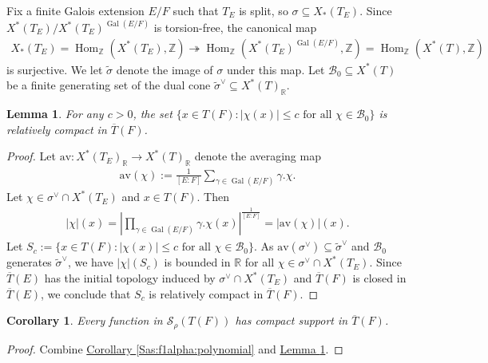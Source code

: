 \documentclass[10pt]{amsart}
\newtheorem{corollary}{Corollary}[theorem]
\newtheorem{lemma}[theorem]{Lemma}
\theoremstyle{definition}
\numberwithin{equation}{section}
\DeclareMathOperator{\Hom}{\mathrm{Hom}}
\DeclareMathOperator{\Gal}{\mathrm{Gal}}
\numberwithin{equation}{subsection}
\newcommand{\ZZ}{\mathbb{Z}}
\newcommand{\RR}{\mathbb{R}}
\begin{document}
Fix a finite Galois extension $E/F$ such that $T_E$ is split, so $\sigma\subseteq X_\ast(T_E).$  Since $X^*(T_{E})/X^*(T_{E})^{\Gal(E/F)}$ is torsion-free, the canonical map 
\begin{align*}
    X_*(T_{E}) = \Hom_\ZZ(X^*(T_{E}),\ZZ) \twoheadrightarrow \Hom_\ZZ(X^*(T_{E})^{\Gal(E/F)},\ZZ) = \Hom_\ZZ(X^*(T),\ZZ)
\end{align*}
is surjective. We let $\widetilde{\sigma}$ denote the image of $\sigma$ under this map. Let $\mathcal{B}_0\subseteq X^*(T)$ be a finite generating set of the dual cone $\widetilde{\sigma}^\vee\subseteq X^*(T)_\RR$. 

\begin{lemma}\label{toric:relcpt:1}
For any $c>0$, the set $\{x\in T(F): |\chi(x)|\leq c\text{ for all }\chi\in \mathcal{B}_0\}$ is relatively compact in $\overline{T}(F)$.
\end{lemma}
\begin{proof} Let $\mathrm{av}:X^*(T_E)_\RR\to X^*(T)_\RR$ denote the averaging map
\begin{align*}
    \mathrm{av}(\chi) := \frac{1}{[E:F]}\sum_{\gamma\in\Gal(E/F)}\gamma.\chi.
\end{align*}
Let $\chi\in \sigma^\vee\cap X^*(T_E)$ and $x\in T(F)$. Then
\begin{align*}
    |\chi|(x)= \left|\prod_{\gamma\in \Gal(E/F)}\gamma.\chi(x)\right|^{\frac{1}{[E:F]}} = |\mathrm{av}(\chi)|(x).
\end{align*}
Let $S_c := \{x\in T(F): |\chi(x)|\leq c\text{ for all }\chi\in \mathcal{B}_0\}$. As $\mathrm{av}(\sigma^\vee)\subseteq\widetilde{\sigma}^\vee$ and $\mathcal{B}_0$ generates $\widetilde{\sigma}^\vee$, we have $|\chi|(S_c)$ is bounded in $\mathbb{R}$ for all $\chi\in\sigma^\vee\cap X^*(T_E)$. Since $\overline{T}(E)$ has the initial topology induced by $\sigma^\vee\cap X^*(T_E)$ and $\overline{T}(F)$ is closed in $\overline{T}(E)$, we conclude that $S_c$ is relatively compact in $\overline{T}(F)$.
\end{proof}


\begin{corollary}\label{toric:Srho:cptsupp} Every function in $\mathcal{S}_\rho(T(F))$ has compact support in $\overline{T}(F)$.
\end{corollary}
\begin{proof} 
Combine \hyperref[Sas:f1alpha:polynomial]{Corollary \ref{Sas:f1alpha:polynomial}} and \hyperref[toric:relcpt:1]{Lemma \ref{toric:relcpt:1}}.
\end{proof}
\end{document}
